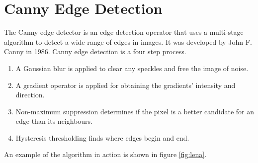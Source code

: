 \documentclass[a4paper,bibliography=totocnumbered,parskip,headsepline]{scrbook}
\begin{document}
\section{Canny Edge Detection}
The Canny edge detector is an edge detection operator that uses a multi-stage algorithm to detect a wide range of edges in images.
It was developed by John F. Canny in 1986.
Canny edge detection is a four step process.
\begin{enumerate}[noitemsep]
\item A Gaussian blur is applied to clear any speckles and free the image of noise.
\item A gradient operator is applied for obtaining the gradients' intensity and direction.
\item Non-maximum suppression determines if the pixel is a better candidate for an edge than its neighbours.
\item Hysteresis thresholding finds where edges begin and end.
\end{enumerate}

An example of the algorithm in action is shown in figure \ref{fig:lena}.
\end{document}
